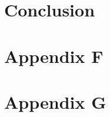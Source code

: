 \documentclass[%
	paper=A4,					%
	twoside=true,				%
	openright,					%
	chapterprefix=true,			%
	11pt,						%
	headings=normal,			%
	bibliography=totoc,			%
	listof=totoc,				%
	titlepage=on,				%
	captions=tableabove,		%
	draft=false,				%
]{scrreprt}
\begin{document}
\chapter{Conclusion}
\label{sec:conclusion}

%
\begin{appendices}
%
%
%	
%
%
\chapter{Appendix F}

\chapter{Appendix G}

\end{appendices} 

\cleardoublepage
{%
\renewcommand{\bibfont}{\normalfont\small}
\setlength{\biblabelsep}{0pt}
\setlength{\bibitemsep}{0.5\baselineskip plus 0.5\baselineskip}
\printbibliography} 
\end{document}
